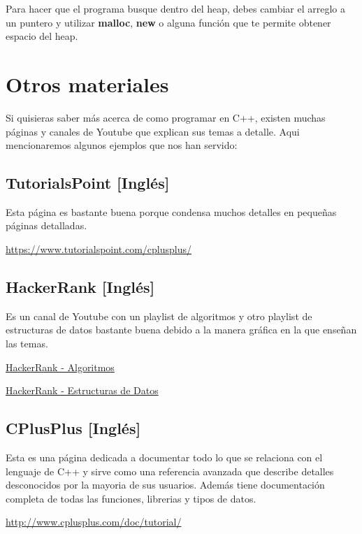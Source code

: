 \documentclass{article}
\begin{document}
Para hacer que el programa busque dentro del heap, debes cambiar el arreglo a un puntero y utilizar \textbf{malloc}, \textbf{new} o alguna función que te permite obtener espacio del heap.

\section{Otros materiales}

Si quisieras saber más acerca de como programar en C++, existen muchas páginas y canales de Youtube que explican sus temas a detalle. Aqui mencionaremos algunos ejemplos que nos han servido:

\subsection{TutorialsPoint [Inglés]}

Esta página es bastante buena porque condensa muchos detalles en pequeñas páginas detalladas.

\url{https://www.tutorialspoint.com/cplusplus/}

\subsection{HackerRank [Inglés]}

Es un canal de Youtube con un playlist de algoritmos y otro playlist de estructuras de datos bastante buena debido a la manera gráfica en la que enseñan las temas.

\href{https://www.youtube.com/playlist?list=PLI1t_8YX-ApvMthLj56t1Rf-Buio5Y8KL}{HackerRank - Algoritmos}

\href{https://www.youtube.com/playlist?list=PLI1t_8YX-Apv-UiRlnZwqqrRT8D1RhriX}{HackerRank - Estructuras de Datos}

\subsection{CPlusPlus [Inglés]}

Esta es una página dedicada a documentar todo lo que se relaciona con el lenguaje de C++ y sirve como una referencia avanzada que describe detalles desconocidos por la mayoria de sus usuarios. Además tiene documentación completa de todas las funciones, librerias y tipos de datos.

\url{http://www.cplusplus.com/doc/tutorial/}
\end{document}
